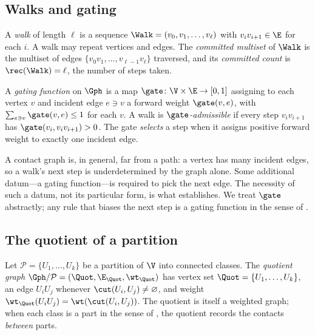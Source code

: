 \subsection{Walks and gating}

\begin{definition}[Walk]
\label{def:walk}
A \emph{walk} of length $\ell$ is a sequence
$\Walk=(v_0,v_1,\dots,v_\ell)$ with $v_{i}v_{i+1}\in\E$ for each $i$. A walk may
repeat vertices and edges. The \emph{committed multiset} of $\Walk$ is the
multiset of edges $\{v_0v_1,\dots,v_{\ell-1}v_\ell\}$ traversed, and its
\emph{committed count} is $\rec(\Walk)=\ell$, the number of steps taken.
\end{definition}

\begin{definition}
\label{def:gate}
A \emph{gating function} on $\Gph$ is a map
$\gate\colon\V\times\E\to[0,1]$ assigning to each vertex $v$ and incident edge
$e\ni v$ a forward weight $\gate(v,e)$, with $\sum_{e\ni v}\gate(v,e)\le 1$ for
each $v$. A walk is \emph{$\gate$-admissible} if every step $v_iv_{i+1}$ has
$\gate(v_i,v_iv_{i+1})>0$. The gate \emph{selects} a step when it assigns
positive forward weight to exactly one incident edge.
\end{definition}

\begin{remark}
\label{rem:gate-need}
A contact graph is, in general, far from a path: a vertex has many incident
edges, so a walk's next step is underdetermined by the graph alone. Some
additional datum---a gating function---is required to pick the next edge. The
necessity of such a datum, not its particular form, is what
 establishes. We treat $\gate$ abstractly; any rule that biases
the next step is a gating function in the sense of .
\end{remark}

\subsection{The quotient of a partition}

\begin{definition}
\label{def:quotient}
Let $\mathcal{P}=\{U_1,\dots,U_k\}$ be a partition of $\V$ into connected
classes. The \emph{quotient graph} $\Gph/\mathcal{P}=(\Quot,\E_{\Quot},\wt_{\Quot})$
has vertex set $\Quot=\{U_1,\dots,U_k\}$, an edge $U_iU_j$ whenever
$\cut(U_i,U_j)\neq\varnothing$, and weight
$\wt_{\Quot}(U_iU_j)=\wt(\cut(U_i,U_j))$. The quotient is itself a weighted
graph; when each class is a part in the sense of , the
quotient records the contacts \emph{between} parts.
\end{definition}

